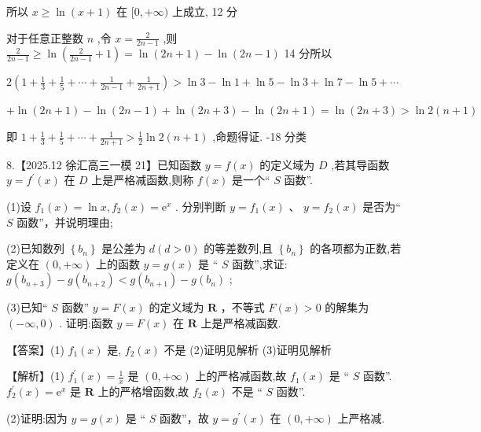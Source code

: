 \documentclass[10pt]{article}
\begin{document}
所以 \(x \geq  \ln \left( {x + 1}\right)\) 在 \(\lbrack 0, + \infty )\) 上成立, 12 分

对于任意正整数 \(n\) ,令 \(x = \frac{2}{{2n} - 1}\) ,则 \(\frac{2}{{2n} - 1} \geq  \ln \left( {\frac{2}{{2n} - 1} + 1}\right)  = \ln \left( {{2n} + 1}\right)  - \ln \left( {{2n} - 1}\right)\) 14 分所以

\(2\left( {1 + \frac{1}{3} + \frac{1}{5} + \cdots  + \frac{1}{{2n} - 1} + \frac{1}{{2n} + 1}}\right)  > \ln 3 - \ln 1 + \ln 5 - \ln 3 + \ln 7 - \ln 5 + \cdots\)

\(+ \ln \left( {{2n} + 1}\right)  - \ln \left( {{2n} - 1}\right)  + \ln \left( {{2n} + 3}\right)  - \ln \left( {{2n} + 1}\right)  = \ln \left( {{2n} + 3}\right)  > \ln 2\left( {n + 1}\right)\)

即 \(1 + \frac{1}{3} + \frac{1}{5} + \cdots  + \frac{1}{{2n} + 1} > \frac{1}{2}\ln 2\left( {n + 1}\right)\) ,命题得证. -18 分类

8.【2025.12 徐汇高三一模 21】已知函数 \(y = f\left( x\right)\) 的定义域为 \(D\) ,若其导函数 \(y = {f}^{\prime }\left( x\right)\) 在 \(D\) 上是严格减函数,则称 \(f\left( x\right)\) 是一个“ \(S\) 函数”.

(1)设 \({f}_{1}\left( x\right)  = \ln x,{f}_{2}\left( x\right)  = {\mathrm{e}}^{x}\) . 分别判断 \(y = {f}_{1}\left( x\right) \text{ 、 }y = {f}_{2}\left( x\right)\) 是否为“ \(S\) 函数”，并说明理由;

(2)已知数列 \(\left\{  {b}_{n}\right\}\) 是公差为 \(d\left( {d > 0}\right)\) 的等差数列,且 \(\left\{  {b}_{n}\right\}\) 的各项都为正数,若定义在 \(\left( {0, + \infty }\right)\) 上的函数 \(y = g\left( x\right)\) 是 “ \(S\) 函数”,求证: \(g\left( {b}_{n + 3}\right)  - g\left( {b}_{n + 2}\right)  < g\left( {b}_{n + 1}\right)  - g\left( {b}_{n}\right)\) ;

(3)已知“ \(S\) 函数” \(y = F\left( x\right)\) 的定义域为 \(\mathbf{R}\) ，不等式 \(F\left( x\right)  > 0\) 的解集为 \(\left( {-\infty ,0}\right)\) . 证明:函数 \(y = F\left( x\right)\) 在 \(\mathbf{R}\) 上是严格减函数.

【答案】(1) \({f}_{1}\left( x\right)\) 是, \({f}_{2}\left( x\right)\) 不是 (2)证明见解析 (3)证明见解析

【解析】(1) \({f}_{1}^{\prime }\left( x\right)  = \frac{1}{x}\) 是 \(\left( {0, + \infty }\right)\) 上的严格减函数,故 \({f}_{1}\left( x\right)\) 是 “ \(S\) 函数”. \({f}_{2}^{\prime }\left( x\right)  = {\mathrm{e}}^{x}\) 是 \(\mathbf{R}\) 上的严格增函数,故 \({f}_{2}\left( x\right)\) 不是 “ \(S\) 函数”.

(2)证明:因为 \(y = g\left( x\right)\) 是 “ \(S\) 函数”，故 \(y = {g}^{\prime }\left( x\right)\) 在 \(\left( {0, + \infty }\right)\) 上严格减.
\end{document}
